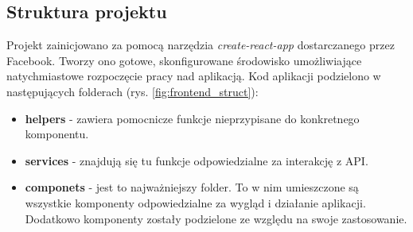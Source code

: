 \documentclass[declaration,shortabstract]{iithesis}
\begin{document}
\subsection{Struktura projektu}
Projekt zainicjowano za pomocą narzędzia \textit{create-react-app} dostarczanego przez Facebook. Tworzy ono gotowe, skonfigurowane środowisko umożliwiające natychmiastowe rozpoczęcie pracy nad aplikacją. Kod aplikacji podzielono w następujących folderach (rys. \ref{fig:frontend_struct}):
\begin{itemize}
    \item \textbf{\textunderscore helpers} - zawiera pomocnicze funkcje nieprzypisane do konkretnego komponentu.
    \item \textbf{\textunderscore services} - znajdują się tu funkcje odpowiedzialne za interakcję z API.
    \item \textbf{componets} - jest to najważniejszy folder. To w nim umieszczone są wszystkie komponenty odpowiedzialne za wygląd i działanie aplikacji. Dodatkowo komponenty zostały podzielone ze względu na swoje zastosowanie.
\end{itemize}
\end{document}
